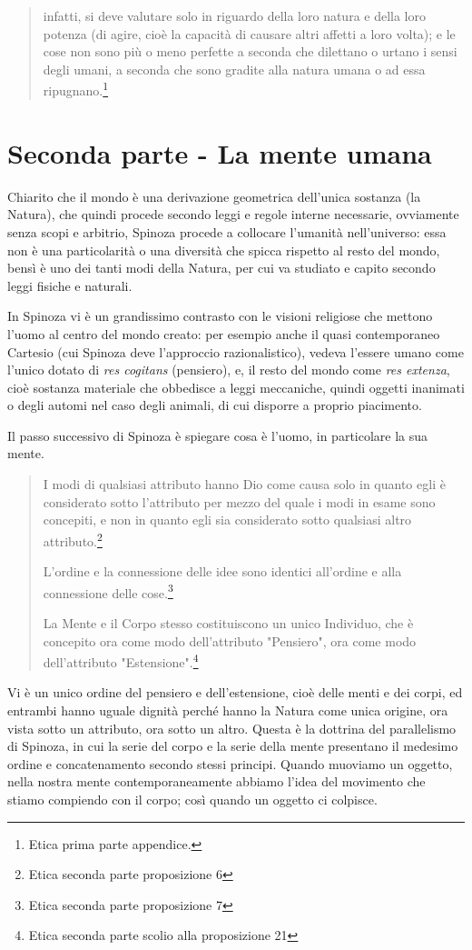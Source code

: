 \begin{quotation}
	infatti, si deve valutare solo in riguardo della loro natura e della loro potenza (di agire, cioè la capacità  di causare altri affetti a loro volta); e le cose non
	sono più o meno perfette a seconda che dilettano o urtano i sensi degli umani, a seconda
	che sono gradite alla natura umana o ad essa ripugnano.\footnote{Etica prima parte appendice.}
	
\end{quotation}
\newpage
\section[La mente umana]{Seconda parte - La mente umana}

\bigskip

Chiarito che il mondo è una derivazione geometrica dell'unica sostanza (la Natura), che quindi procede secondo leggi e regole interne necessarie, ovviamente senza scopi e arbitrio, Spinoza procede a collocare l'umanità nell'universo: essa non è una particolarità o una diversità che spicca rispetto al resto del mondo, bensì è uno dei tanti modi della Natura, per cui va studiato e capito secondo leggi fisiche e naturali.

In Spinoza vi è un grandissimo contrasto con le visioni religiose che mettono l'uomo al centro del mondo creato: per esempio anche il quasi contemporaneo Cartesio (cui Spinoza deve l'approccio razionalistico), vedeva l'essere umano come l'unico dotato di \textit{res cogitans} (pensiero), e, il resto del mondo come \textit{res extenza}, cioè sostanza materiale che obbedisce a leggi meccaniche, quindi oggetti inanimati o degli automi nel caso degli animali, di cui disporre a proprio piacimento.

Il passo successivo di Spinoza è spiegare cosa è l'uomo, in particolare la sua mente.

\begin{quotation}
	\small I modi di qualsiasi attributo hanno Dio come causa solo in quanto egli è considerato sotto l’attributo per mezzo del quale i modi in esame sono concepiti, e non in quanto egli sia considerato sotto qualsiasi altro attributo.\footnote{Etica seconda parte proposizione 6}
	
	\small L’ordine e la connessione delle idee sono identici all’ordine e alla connessione delle cose.\footnote{Etica seconda parte proposizione 7}
	
	\small La Mente e il Corpo stesso costituiscono un unico Individuo,
	che è concepito ora come modo dell’attributo "Pensiero", ora come modo dell’attributo "Estensione".\footnote{Etica seconda parte scolio alla proposizione 21}
	
\end{quotation}
Vi è un unico ordine del pensiero e dell'estensione, cioè delle menti e dei corpi, ed entrambi hanno uguale dignità perché hanno la Natura come unica origine, ora vista sotto un attributo, ora sotto un altro. Questa è la dottrina del parallelismo di Spinoza, in cui la serie del corpo e la serie della mente presentano il medesimo ordine e concatenamento secondo stessi principi. Quando muoviamo un oggetto, nella nostra mente contemporaneamente abbiamo l'idea del movimento che stiamo compiendo con il corpo; così quando un oggetto ci colpisce.

